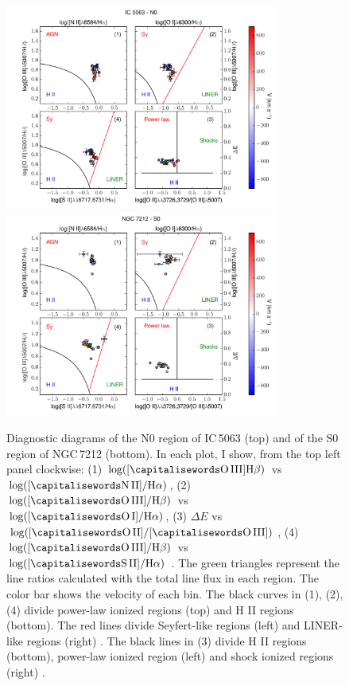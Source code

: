 \documentclass[../main.tex]{subfiles}
\begin{document}
\begin{figure} 
\centering
\includegraphics[width=0.8\textwidth]{images/paper1/IC5063_n0_diag.pdf}\\
\includegraphics[width=0.8\textwidth]{images/paper1/NGC7212_s0_diag.pdf}\\
\caption[]{Diagnostic diagrams of the N0 region of IC\,5063 (top) and of the S0 region of NGC\,7212 (bottom).  In each plot, I show, from the top left panel clockwise: (1) $\log([\rm\ion{O}{III}] \Hb)$ vs $\log([\rm\ion{N}{II}]/ \Ha)$, (2) $\log([\rm\ion{O}{III}]/ \Hb)$ vs $\log([\rm\ion{O}{I}]/ \Ha)$, (3) $\Delta E$ vs $\log([\rm\ion{O}{II}]/[\rm\ion{O}{III}])$, (4) $\log([\rm\ion{O}{III}]/ \Hb)$ vs $\log([\rm\ion{S}{II}]/ \Ha)$ \citep{Baldwin81, Veilleux87}. The green triangles represent the line ratios calculated with the total line flux in each region. The color bar shows the velocity of each bin. The black curves in (1), (2), (4) divide power-law ionized regions (top) and H II regions (bottom). The red lines divide Seyfert-like regions (left) and LINER-like regions (right) \citep{Kewley06}. The black lines in (3) divide H II regions (bottom), power-law ionized region (left) and shock ionized regions (right) \citep{Baldwin81}.}
\label{fig:diag_es}
\end{figure}
\end{document}
